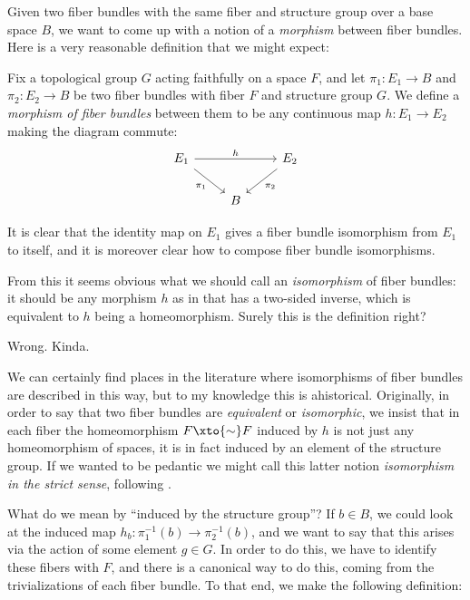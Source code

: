\documentclass[11pt]{book}
\begin{document}
Given two fiber bundles with the same fiber and structure group over a base space $B$, we want to come up with a notion of a \emph{morphism} between fiber bundles. Here is a very reasonable definition that we might expect:

\begin{definition}\label{def:fiber-bundle-morphism} Fix a topological group $G$ acting faithfully on a space $F$, and let $\pi_1 \colon E_1 \to B$ and $\pi_2 \colon E_2 \to B$ be two fiber bundles with fiber $F$ and structure group $G$. We define a \emph{morphism of fiber bundles} between them to be any continuous map $h \colon E_1 \to E_2$ making the diagram commute:
\[ \begin{tikzcd}
    E_1\ar[rr,"h" above]\ar[dr,"\pi_1" below left]&  & E_2\ar[dl,"\pi_2" below right]\\
     & B & 
\end{tikzcd} \]
\end{definition}
It is clear that the identity map on $E_1$ gives a fiber bundle isomorphism from $E_1$ to itself, and it is moreover clear how to compose fiber bundle isomorphisms.

From this it seems obvious what we should call an \emph{isomorphism} of fiber bundles: it should be any morphism $h$ as in  that has a two-sided inverse, which is equivalent to $h$ being a homeomorphism. Surely this is the definition right?

Wrong. Kinda.

We can certainly find places in the literature where isomorphisms of fiber bundles are described in this way, but to my knowledge this is ahistorical. Originally, in order to say that two fiber bundles are \emph{equivalent} or \emph{isomorphic}, we insist that in each fiber the homeomorphism $F \xto{\sim} F$ induced by $h$ is not just any homeomorphism of spaces, it is in fact induced by an element of the structure group. If we wanted to be pedantic we might call this latter notion \emph{isomorphism in the strict sense}, following \cite[\S2.4]{Steenrod-fibre-bundles}. 

What do we mean by ``induced by the structure group''? If $b\in B$, we could look at the induced map $h_b \colon \pi_1^{-1}(b) \to \pi_2^{-1}(b)$, and we want to say that this arises via the action of some element $g\in G$. In order to do this, we have to identify these fibers with $F$, and there is a canonical way to do this, coming from the trivializations of each fiber bundle. To that end, we make the following definition:
\end{document}
